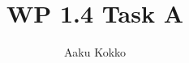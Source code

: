 \documentclass{article}
\title{WP 1.4 Task A}
\author{Aaku Kokko}
\date{}
\begin{document}
\maketitle{}


\end{document}
